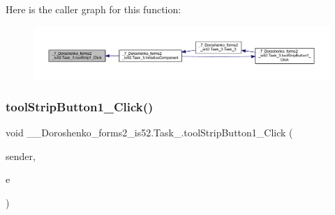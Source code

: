 Here is the caller graph for this function\+:
\nopagebreak
\begin{figure}[H]
\begin{center}
\leavevmode
\includegraphics[width=350pt]{class__7___doroshenko__forms2__is52_1_1_task__3_a2dd10c4b2313efa2c028a589b73db176_icgraph}
\end{center}
\end{figure}
\hypertarget{class__7___doroshenko__forms2__is52_1_1_task__3_aaecbab376c02299c5fa94fbc39072759}{}\label{class__7___doroshenko__forms2__is52_1_1_task__3_aaecbab376c02299c5fa94fbc39072759} 
\subsubsection{\texorpdfstring{tool\+Strip\+Button1\+\_\+\+Click()}{toolStripButton1\_Click()}}
{\footnotesize\ttfamily void \+\_\+\_\+\+Doroshenko\+\_\+forms2\+\_\+is52.\+Task\+\_.\+tool\+Strip\+Button1\+\_\+\+Click (\begin{DoxyParamCaption}\item[{object}]{sender,  }\item[{Event\+Args}]{e }\end{DoxyParamCaption})\hspace{0.3cm}{\ttfamily [private]}}

